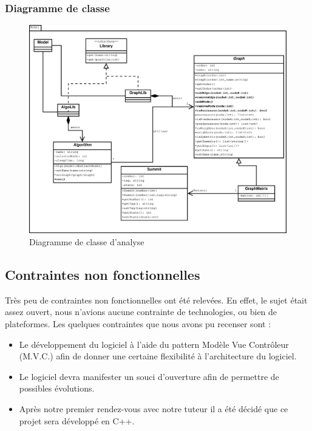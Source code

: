 \documentclass[11pt,a4paper]{article}
\begin{document}
			\subsubsection{Diagramme de classe}
				\begin{figure}[htbp]
					\begin{center}
						\includegraphics[scale=0.35]{Analyse_class.eps}
					\end{center}
					\caption{Diagramme de classe d'analyse}
					\label{img_class_analyse}
				\end{figure}
		\subsection{Contraintes non fonctionnelles}
			
			Très peu de contraintes non fonctionnelles ont été relevées. En effet, le sujet était assez ouvert, nous n'avions aucune contrainte de technologies, ou bien de plateformes. Les quelques contraintes que nous avons pu recenser sont :
			\begin{itemize}
				\item Le développement du logiciel à l'aide du pattern Modèle Vue Contrôleur (M.V.C.) afin de donner une certaine flexibilité à l'architecture du logiciel.
				\item Le logiciel devra manifester un souci d'ouverture afin de permettre de possibles évolutions.
				\item Après notre premier rendez-vous avec notre tuteur il a été décidé que ce projet sera développé en C++.
			\end{itemize}
			
\end{document}
